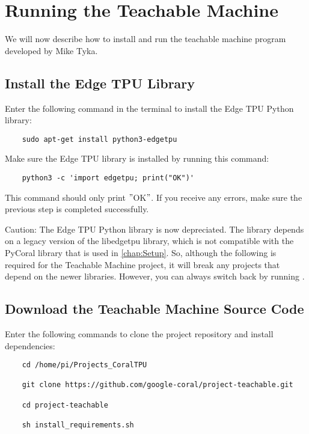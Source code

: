 %
%

\chapter{Running the Teachable Machine}

We will now describe how to install and run the teachable machine program developed by Mike Tyka.

\section{Install the Edge TPU Library}

Enter the following command in the terminal to install the Edge TPU Python library:

\begin{verbatim}
	sudo apt-get install python3-edgetpu
\end{verbatim}

Make sure the Edge TPU library is installed by running this command:

\begin{verbatim}
	python3 -c 'import edgetpu; print("OK")'
\end{verbatim}

This command should only print $"$OK$"$. If you receive any errors, make sure the previous step is completed successfully.

\bigskip

Caution: The Edge TPU Python library is now depreciated. The library depends on a legacy version of the libedgetpu library, which is not compatible with the PyCoral library that is used in \autoref{chap:Setup}. So, although the following is required for the Teachable Machine project, it will break any projects that depend on the newer libraries. However, you can always switch back by running .




\section{Download the Teachable Machine Source Code}


Enter the following commands to clone the project repository and install dependencies:

\begin{verbatim}
	cd /home/pi/Projects_CoralTPU
	
	git clone https://github.com/google-coral/project-teachable.git
	
	cd project-teachable
	
	sh install_requirements.sh
\end{verbatim}

